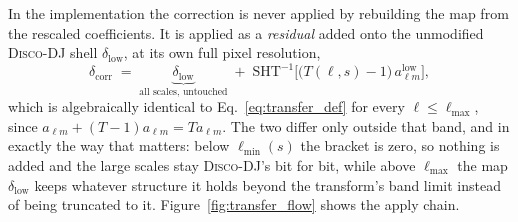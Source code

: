 \documentclass{report}
\begin{document}
In the implementation the correction is never applied by rebuilding the map from the rescaled coefficients. It is applied as a \emph{residual} added onto the unmodified \textsc{Disco-DJ} shell \mbox{$\delta_{\mathrm{low}}$}, at its own full pixel resolution,
\begin{equation}
  \delta_{\mathrm{corr}} \;=\; \underbrace{\delta_{\mathrm{low}}}_{\text{all scales, untouched}}
  \;+\; \mathrm{SHT}^{-1}\!\Big[\big(T(\ell,s) - 1\big)\, a_{\ell m}^{\mathrm{low}}\Big],
  \label{eq:transfer_residual}
\end{equation}
which is algebraically identical to Eq.~\eqref{eq:transfer_def} for every \mbox{$\ell \le \ell_{\max}$}, since \mbox{$a_{\ell m} + (T-1)a_{\ell m} = T a_{\ell m}$}. The two differ only outside that band, and in exactly the way that matters: below \mbox{$\ell_{\min}(s)$} the bracket is zero, so nothing is added and the large scales stay \textsc{Disco-DJ}'s bit for bit, while above \mbox{$\ell_{\max}$} the map $\delta_{\mathrm{low}}$ keeps whatever structure it holds beyond the transform's band limit instead of being truncated to it. Figure~\ref{fig:transfer_flow} shows the apply chain.
\end{document}
